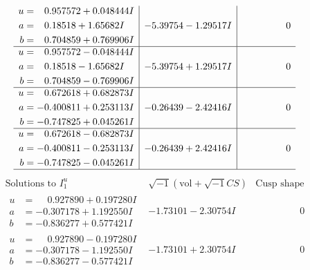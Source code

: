 \documentclass[1p]{elsarticle_modified}
\theoremstyle{definition}
\newcommand{\I}{\sqrt{-1}}
\begin{document}
$$\begin{array}{c|c|c}
\begin{aligned}
u &= \phantom{-}0.957572 + 0.048444 I \\
a &= \phantom{-}0.18518 + 1.65682 I \\
b &= \phantom{-}0.704859 + 0.769906 I\end{aligned}
 & -5.39754 - 1.29517 I & \phantom{-0.000000 } 0 \\ \hline\begin{aligned}
u &= \phantom{-}0.957572 - 0.048444 I \\
a &= \phantom{-}0.18518 - 1.65682 I \\
b &= \phantom{-}0.704859 - 0.769906 I\end{aligned}
 & -5.39754 + 1.29517 I & \phantom{-0.000000 } 0 \\ \hline\begin{aligned}
u &= \phantom{-}0.672618 + 0.682873 I \\
a &= -0.400811 + 0.253113 I \\
b &= -0.747825 + 0.045261 I\end{aligned}
 & -0.26439 - 2.42416 I & \phantom{-0.000000 } 0 \\ \hline\begin{aligned}
u &= \phantom{-}0.672618 - 0.682873 I \\
a &= -0.400811 - 0.253113 I \\
b &= -0.747825 - 0.045261 I\end{aligned}
 & -0.26439 + 2.42416 I & \phantom{-0.000000 } 0\\
 \hline 
 \end{array}$$\newpage$$\begin{array}{c|c|c}  
\text{Solutions to }I^u_{1}& \I (\text{vol} + \sqrt{-1}CS) & \text{Cusp shape}\\
 \hline 
\begin{aligned}
u &= \phantom{-}0.927890 + 0.197280 I \\
a &= -0.307178 + 1.192550 I \\
b &= -0.836277 + 0.577421 I\end{aligned}
 & -1.73101 - 2.30754 I & \phantom{-0.000000 } 0 \\ \hline\begin{aligned}
u &= \phantom{-}0.927890 - 0.197280 I \\
a &= -0.307178 - 1.192550 I \\
b &= -0.836277 - 0.577421 I\end{aligned}
 & -1.73101 + 2.30754 I & \phantom{-0.000000 } 0 \\ \hline\begin{aligned}

\end{aligned}
\end{array}$$
\end{document}
